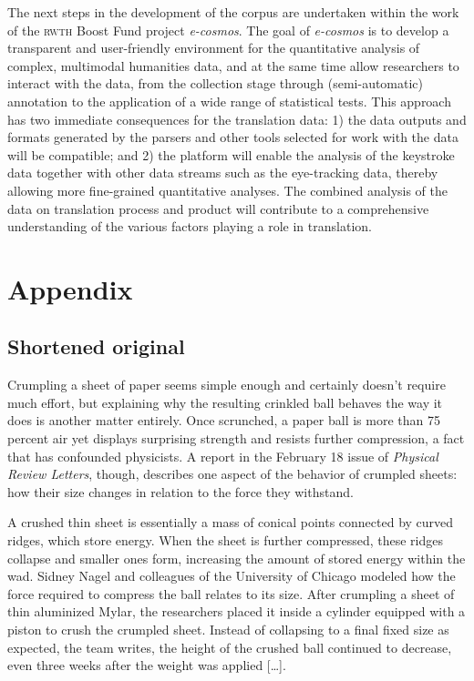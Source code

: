 \documentclass[output=paper]{LSP/langsci}
\begin{document}
The next steps in the development of the corpus are undertaken within the work of the \textsc{rwth} Boost Fund project \textit{e-cosmos}. The goal of \textit{e-cosmos} is to develop a transparent and user-friendly environment for the quantitative analysis of complex, multimodal humanities data, and at the same time allow researchers to interact with the data, from the collection stage through (semi-automatic) annotation to the application of a wide range of statistical tests. This approach has two immediate consequences for the translation data: 1) the data outputs and formats generated by the parsers and other tools selected for work with the data will be compatible; and 2) the platform will enable the analysis of the keystroke data together with other data streams such as the eye-tracking data, thereby allowing more fine-grained quantitative analyses. The combined analysis of the data on translation process and product will contribute to a comprehensive understanding of the various factors playing a role in translation.  


\section*{Appendix}

\subsection*{Shortened original}
Crumpling a sheet of paper seems simple enough and certainly doesn't require much effort, but explaining why the resulting crinkled ball behaves the way it does is another matter entirely. Once scrunched, a paper ball is more than 75 percent air yet displays surprising strength and resists further compression, a fact that has confounded physicists. A report in the February 18 issue of \textit{Physical Review Letters}, though, describes one aspect of the behavior of crumpled sheets: how their size changes in relation to the force they withstand.
 
A crushed thin sheet is essentially a mass of conical points connected by curved ridges, which store energy. When the sheet is further compressed, these ridges collapse and smaller ones form, increasing the amount of stored energy within the wad. Sidney Nagel and colleagues of the University of Chicago modeled how the force required to compress the ball relates to its size. After crumpling a sheet of thin aluminized Mylar, the researchers placed it inside a cylinder equipped with a piston to crush the crumpled sheet. Instead of collapsing to a final fixed size as expected, the team writes, the height of the crushed ball continued to decrease, even three weeks after the weight was applied […].
 
\end{document}
